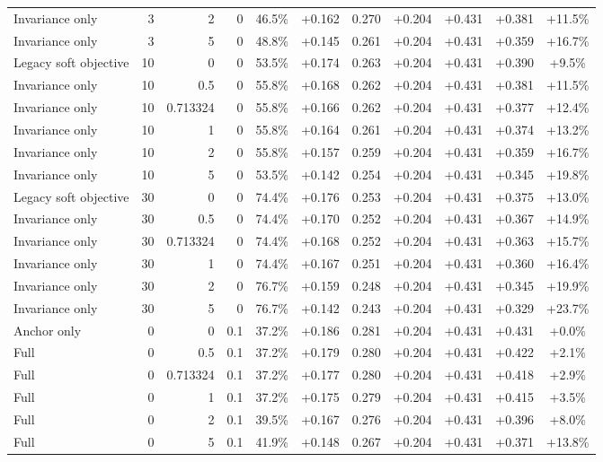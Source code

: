 \begin{table}[htbp]
\begin{tabular}{lrrrccccccc}
Invariance only & 3 & 2 & 0 & 46.5\% & +0.162 & 0.270 & +0.204 & +0.431 & +0.381 & +11.5\% \\
Invariance only & 3 & 5 & 0 & 48.8\% & +0.145 & 0.261 & +0.204 & +0.431 & +0.359 & +16.7\% \\
Legacy soft objective & 10 & 0 & 0 & 53.5\% & +0.174 & 0.263 & +0.204 & +0.431 & +0.390 & +9.5\% \\
Invariance only & 10 & 0.5 & 0 & 55.8\% & +0.168 & 0.262 & +0.204 & +0.431 & +0.381 & +11.5\% \\
Invariance only & 10 & 0.713324 & 0 & 55.8\% & +0.166 & 0.262 & +0.204 & +0.431 & +0.377 & +12.4\% \\
Invariance only & 10 & 1 & 0 & 55.8\% & +0.164 & 0.261 & +0.204 & +0.431 & +0.374 & +13.2\% \\
Invariance only & 10 & 2 & 0 & 55.8\% & +0.157 & 0.259 & +0.204 & +0.431 & +0.359 & +16.7\% \\
Invariance only & 10 & 5 & 0 & 53.5\% & +0.142 & 0.254 & +0.204 & +0.431 & +0.345 & +19.8\% \\
Legacy soft objective & 30 & 0 & 0 & 74.4\% & +0.176 & 0.253 & +0.204 & +0.431 & +0.375 & +13.0\% \\
Invariance only & 30 & 0.5 & 0 & 74.4\% & +0.170 & 0.252 & +0.204 & +0.431 & +0.367 & +14.9\% \\
Invariance only & 30 & 0.713324 & 0 & 74.4\% & +0.168 & 0.252 & +0.204 & +0.431 & +0.363 & +15.7\% \\
Invariance only & 30 & 1 & 0 & 74.4\% & +0.167 & 0.251 & +0.204 & +0.431 & +0.360 & +16.4\% \\
Invariance only & 30 & 2 & 0 & 76.7\% & +0.159 & 0.248 & +0.204 & +0.431 & +0.345 & +19.9\% \\
Invariance only & 30 & 5 & 0 & 76.7\% & +0.142 & 0.243 & +0.204 & +0.431 & +0.329 & +23.7\% \\
Anchor only & 0 & 0 & 0.1 & 37.2\% & +0.186 & 0.281 & +0.204 & +0.431 & +0.431 & +0.0\% \\
Full & 0 & 0.5 & 0.1 & 37.2\% & +0.179 & 0.280 & +0.204 & +0.431 & +0.422 & +2.1\% \\
Full & 0 & 0.713324 & 0.1 & 37.2\% & +0.177 & 0.280 & +0.204 & +0.431 & +0.418 & +2.9\% \\
Full & 0 & 1 & 0.1 & 37.2\% & +0.175 & 0.279 & +0.204 & +0.431 & +0.415 & +3.5\% \\
Full & 0 & 2 & 0.1 & 39.5\% & +0.167 & 0.276 & +0.204 & +0.431 & +0.396 & +8.0\% \\
Full & 0 & 5 & 0.1 & 41.9\% & +0.148 & 0.267 & +0.204 & +0.431 & +0.371 & +13.8\% \\

\end{tabular}
\end{table}
